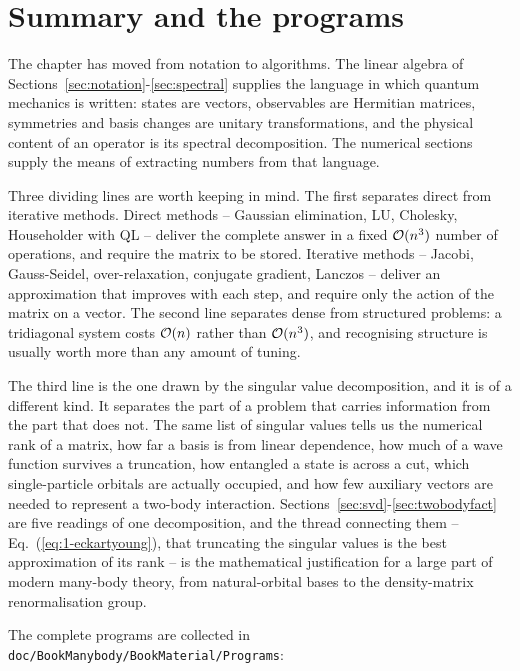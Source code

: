 \section{Summary and the programs}
\label{sec:ch1summary}

The chapter has moved from notation to algorithms.  The linear algebra of
Sections~\ref{sec:notation}-\ref{sec:spectral} supplies the language in which
quantum mechanics is written: states are vectors, observables are Hermitian
matrices, symmetries and basis changes are unitary transformations, and the
physical content of an operator is its spectral decomposition.  The numerical
sections supply the means of extracting numbers from that language.

Three dividing lines are worth keeping in mind.  The first separates direct
from iterative methods.  Direct methods -- Gaussian elimination, LU,
Cholesky, Householder with QL -- deliver the complete answer in a fixed
$\mathcal{O}(n^3)$ number of operations, and require the matrix to be stored.
Iterative methods -- Jacobi, Gauss-Seidel, over-relaxation, conjugate
gradient, Lanczos -- deliver an approximation that improves with each step,
and require only the action of the matrix on a vector.  The second line
separates dense from structured problems: a tridiagonal system costs
$\mathcal{O}(n)$ rather than $\mathcal{O}(n^3)$, and recognising structure is usually
worth more than any amount of tuning.

The third line is the one drawn by the singular value decomposition, and it
is of a different kind.  It separates the part of a problem that carries
information from the part that does not.  The same list of singular values
tells us the numerical rank of a matrix, how far a basis is from linear
dependence, how much of a wave function survives a truncation, how entangled
a state is across a cut, which single-particle orbitals are actually
occupied, and how few auxiliary vectors are needed to represent a two-body
interaction.  Sections~\ref{sec:svd}-\ref{sec:twobodyfact} are five readings
of one decomposition, and the thread connecting them --
Eq.~(\ref{eq:1-eckartyoung}), that truncating the singular values is the best
approximation of its rank -- is the mathematical justification for a large
part of modern many-body theory, from natural-orbital bases to the
density-matrix renormalisation group.

The complete programs are collected in
\texttt{doc/BookManybody/BookMaterial/Programs}:

